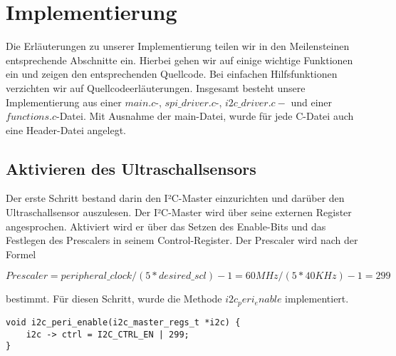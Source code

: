 \documentclass[parskip,
							 oneside,
							 11pt,
							 noheadingspace,
							 accentcolor=tud1d,
							 bigchapter,
							 colorback]{tudreport}
\begin{document}
\chapter{Implementierung}
	Die Erläuterungen zu unserer Implementierung teilen wir in den Meilensteinen entsprechende Abschnitte ein. Hierbei gehen wir auf einige wichtige Funktionen ein und zeigen den entsprechenden Quellcode. Bei einfachen Hilfsfunktionen verzichten wir auf Quellcodeerläuterungen.
	Insgesamt besteht unsere Implementierung aus einer $main.c$-, $spi\_driver.c$-, $i2c\_driver.c-$ und einer $functions.c$-Datei. Mit Ausnahme der main-Datei, wurde für jede C-Datei auch eine Header-Datei angelegt.

\section{Aktivieren des Ultraschallsensors}
Der erste Schritt bestand darin den I²C-Master einzurichten und darüber den Ultraschallsensor auszulesen. 
Der I²C-Master wird über seine externen Register angesprochen. Aktiviert wird er über das Setzen des Enable-Bits und das Festlegen des Prescalers in seinem Control-Register. Der Prescaler wird nach der Formel

\begin{math}
Prescaler = peripheral\_clock / (5 * desired\_scl) - 1 = 60 MHz / (5 * 40 KHz) - 1 = 299
\end{math}
 
 bestimmt. Für diesen Schritt, wurde die Methode $i2c_peri_enable$ implementiert.


\begin{lstlisting}
void i2c_peri_enable(i2c_master_regs_t *i2c) {
	i2c -> ctrl = I2C_CTRL_EN | 299;
}
\end{lstlisting} 
\end{document}
